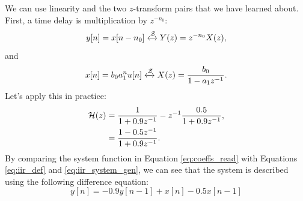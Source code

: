 We can use linearity and the two $z$-transform pairs that we have
learned about. First, a time delay is multiplication by $z^{-n_0}$:
\begin{equation}
    y[n] = x[n-n_0] \xleftrightarrow{\mathcal{Z}} Y(z) = z^{-n_0}X(z),
\end{equation}
and
\begin{equation}
    x[n] = b_0 a_1^n u[n] \xleftrightarrow{\mathcal{Z}} X(z) = \frac{b_0}{1-a_1 z^{-1}}.
\end{equation}
Let's apply this in practice:
\begin{align}
    \mathcal{H}(z) & = \frac{1}{1+0.9 z^{-1}} - z^{-1}\frac{0.5}{1+ 0.9 z^{-1}}, \\
         & = \frac{1-0.5z^{-1}}{1+0.9 z^{-1}} \label{eq:coeffs_read}.
\end{align}
By comparing the system function in Equation \ref{eq:coeffs_read} with
Equations \ref{eq:iir_def} and \ref{eq:iir_system_gen}, we can see
that the system is described using the following difference equation:
\begin{equation}
    y[n] = -0.9 y[n-1] +x[n] - 0.5x[n-1]
\end{equation}
